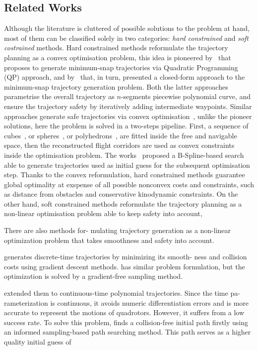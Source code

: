 \subsection{Related Works}
Although the literature is cluttered of possible solutions to the problem at hand, most of them can be classified solely in two
categories: \emph{hard constrained} and \emph{soft costrained} methods.
Hard constrained methods reformulate the trajectory planning as a convex optimisation problem, this idea 
is pioneered by~\cite{mellinger2011minimum} that proposes to generate minimum-snap trajectories
via Quadratic Programming (QP) approach, and by~\cite{richter2016polynomial} that, in turn, presented a closed-form approach
to the minimum-snap trajectory generation problem.
Both the latter approaches parametrise the overall trajectory as $n$-segments piecewise polynomial curve,
and ensure the trajectory safety by iteratively adding intermediate waypoints.
Similar approaches generate safe trajectories via convex optimisation~\cite{chen2015real, gao2016online, liu2017planning, ding2018trajectory, ding2019efficient, gao2018online},
unlike the pioneer solutions, here the problem is solved in a two-steps pipeline. First, a sequence of cubes~\cite{gao2018online},
or spheres~\cite{gao2019flying}, or polyhedrons~\cite{liu2017planning}, are fitted inside the free and navigable space, then the
reconstructed flight corridors are used as convex constraints inside the optimisation problem.
The works~\cite{ding2018trajectory, ding2019efficient} proposed a B-Spline-based search able to generate trajectories used as 
initial guess for the subsequent optimisation step.
Thanks to the convex reformulation, hard constrained methods guarantee global optimality at exspense of all possible nonconvex
costs and constraints, such as distance from obstacles and conservative kinodynamic constraints.
On the other hand, soft constrained methods reformulate the trajectory planning as a non-linear optimisation problem able to keep
safety into account, 


There are also methods for- mulating trajectory generation as a non-linear optimization problem that takes smoothness
and safety into account. 

\cite{zucker2013chomp} generates discrete-time trajectories by minimizing its smooth- ness and collision costs
using gradient descent methods. 
\cite{kalakrishnan2011stomp} has similar problem formulation, but the optimization is solved by a gradient-free
sampling method. 

\cite{oleynikova2016continuous} extended them to continuous-time polynomial trajectories. Since the time pa- rameterization is continuous,
it avoids numeric differentiation errors and is more accurate to represent the motions of quadrotors. However, it suffers from
a low success rate. To solve this problem, \cite{gao2017gradient} finds a collision-free initial path firstly using an
informed sampling-based path searching method. This path serves as a higher quality initial guess of

